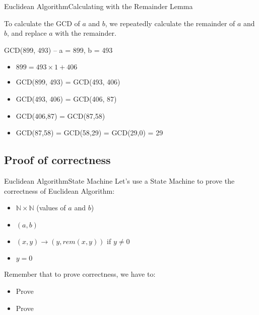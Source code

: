 \begin{frame}{Euclidean Algorithm}{Calculating with the Remainder Lemma}

  To calculate the GCD of $a$ and $b$, we repeatedly calculate the remainder
  of $a$ and $b$, and replace $a$ with the remainder.\bigskip

  \begin{center}
    GCD(899, 493) -- a = 899, b = 493
  \end{center}\bigskip

  \begin{itemize}
  \item $899 = 493 \times 1 + 406$ \hfill {}
  \item GCD(899, 493) = GCD(493, 406) \hfill {}
  \item GCD(493, 406) = GCD(406, 87) \hfill {}
  \item GCD(406,87) = GCD(87,58) \hfill {}
  \item GCD(87,58) = GCD(58,29) = GCD(29,0) = \alert{29}
  \end{itemize}
\end{frame}

\subsection{Proof of correctness}

\begin{frame}{Euclidean Algorithm}{State Machine}
  Let's use a State Machine to prove the correctness of Euclidean Algorithm:\bigskip

  \begin{itemize}
  \item {} $\mathbb{N}\times \mathbb{N}$\hspace{2cm} (values of $a$ and $b$)\bigskip
  \item {} $(a,b)$ \bigskip
  \item {}
    $(x,y) \rightarrow (y,rem(x,y))$ if $y\neq 0$ \bigskip
  \item {} $y = 0$
  \end{itemize}\bigskip

  Remember that to prove correctness, we have to:
  \begin{itemize}
    \item Prove 
    \item Prove 
  \end{itemize}
\end{frame}

